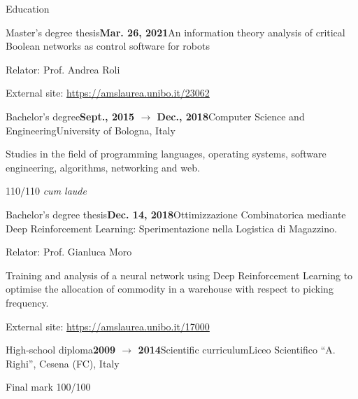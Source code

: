 \documentclass{resume} %
\begin{document}
\begin{rSection}{Education}
\begin{rSubsection}{Master's degree thesis}{\textbf{Mar. 26, 2021}}{An information theory analysis of critical Boolean networks as control software for robots}{\begin{flushright}
                    Relator: Prof. Andrea Roli
            \end{flushright}}
            \item External site: \url{https://amslaurea.unibo.it/23062}
        \end{rSubsection}
        \begin{rSubsection}{Bachelor's degree}{\textbf{Sept., 2015 $\rightarrow$ Dec., 2018}}{Computer Science and Engineering}{University of Bologna, Italy}
            \item Studies in the field of programming languages, operating systems, software engineering, algorithms, networking and web.
            \item 110/110 \emph{cum laude}
        \end{rSubsection}
        
        \begin{rSubsection}{Bachelor's degree thesis}{\textbf{Dec. 14, 2018}}{Ottimizzazione Combinatorica mediante Deep Reinforcement Learning: Sperimentazione nella Logistica di Magazzino.}{\begin{flushright}
                    Relator: Prof. Gianluca Moro
            \end{flushright}}
            \item Training and analysis of a neural network using Deep Reinforcement Learning to optimise the allocation of commodity in a warehouse with respect to picking frequency.
            
            \item External site: \url{https://amslaurea.unibo.it/17000}
        \end{rSubsection}
        
        \begin{rSubsection}{High-school diploma}{\textbf{2009 $\rightarrow$ 2014}}{Scientific curriculum}{Liceo Scientifico ``A. Righi'', Cesena (FC), Italy}
            \item Final mark 100/100
        \end{rSubsection}
        
    \end{rSection}
    
    
\end{document}
